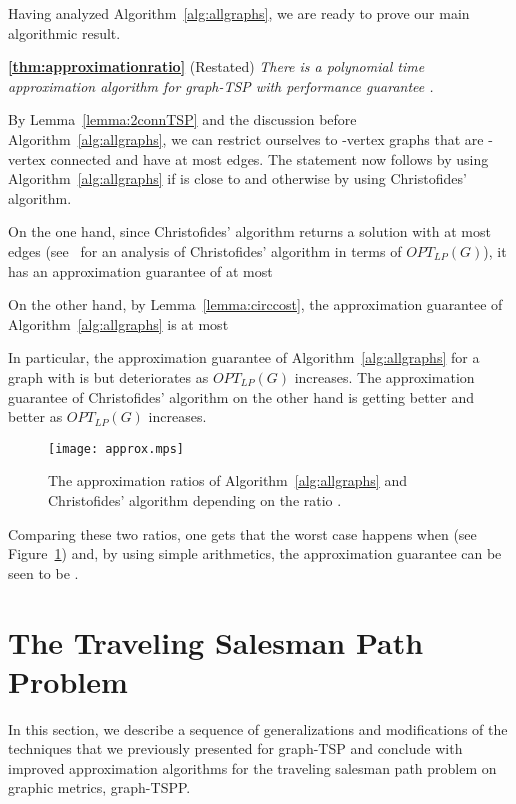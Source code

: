 \documentclass[letterpaper,11pt]{article}
\newenvironment{proof}{\begin{trivlist}
\item[\hskip\labelsep {\bf Proof}.]}{\QED \end{trivlist}}
\newenvironment{apptheorem}{\begin{trivlist}
        \item[\hskip\labelsep {\bf Theorem}]}{ \end{trivlist}}
\newcommand{\QED}{\hfill }
\newcommand{\OLP}[1]{\ensuremath{OPT_{LP}(#1)}}
\newcommand{\TSP}{graph-TSP\xspace}
\newcommand{\HPP}{graph-TSPP\xspace}
\begin{document}
Having analyzed Algorithm~\ref{alg:allgraphs}, we are ready to prove our main algorithmic result.
\begin{apptheorem}{\textbf{\ref{thm:approximationratio}}} (Restated)\emph{ 
  There is a polynomial time approximation algorithm for \TSP with
  performance guarantee .}
\end{apptheorem}

\begin{proof}
  By Lemma~\ref{lemma:2connTSP} and the discussion before
  Algorithm~\ref{alg:allgraphs}, we can restrict ourselves to
  -vertex graphs that are -vertex connected and have at most
   edges.  The statement now follows by using
  Algorithm~\ref{alg:allgraphs} if  is close to  and
  otherwise by using Christofides' algorithm. 

  On the one hand, since Christofides' algorithm returns a solution
  with at most  edges (see~\cite{SW90} for an
analysis of Christofides' algorithm in terms of \OLP{G}), it has an approximation guarantee of at
  most

On the other hand, by Lemma~\ref{lemma:circcost}, the approximation
guarantee of Algorithm~\ref{alg:allgraphs} is at most

In particular, the approximation guarantee of
Algorithm~\ref{alg:allgraphs} for a graph  with  is  but deteriorates as \OLP{G}
increases. The approximation guarantee of Christofides' algorithm on
the other hand is getting better and better as \OLP{G} increases.
\begin{figure}[tb]
    \begin{center}
        \texttt{[image: approx.mps]}
    \end{center}
    \caption{The approximation ratios of
    Algorithm~\ref{alg:allgraphs} and Christofides' algorithm depending on
    the ratio .}
    \label{fig:ratios}
\end{figure}
Comparing these two ratios, one gets that the worst case happens when
 (see Figure~\ref{fig:ratios}) and, by using simple
arithmetics, the approximation guarantee can be seen to be
.
\end{proof}

\section{The Traveling Salesman Path Problem}\label{sec:tspp}
\label{sec:tspp}
In this section, we describe a sequence of generalizations and modifications of
the techniques that we previously presented for \TSP and conclude with improved
approximation algorithms for the traveling salesman path problem on graphic
metrics, \HPP.
\end{document}
